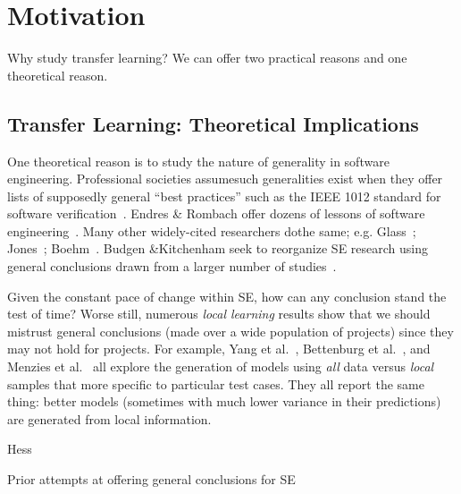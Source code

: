 \section{Motivation}
\label{sec:Motivation}

Why study transfer learning? We can offer two practical reasons and one theoretical reason.

\subsection{Transfer Learning: Theoretical Implications}

One theoretical reason is to study the nature of
generality in software engineering.  Professional
societies assumesuch generalities exist when they
offer lists of supposedly general ``best practices''
such as the IEEE 1012 standard for software
verification~\cite{1012}.  Endres & Rombach offer dozens
of lessons of software engineering~\cite{endres03}.  Many
other widely-cited researchers dothe same; e.g.
Glass~\cite{glass02}; Jones~\cite{jones10}; Boehm~\cite{hoehm00b}.  Budgen
&Kitchenham seek to reorganize SE research using
general conclusions drawn from a larger number of
studies~\cite{budgen06,budgen09}.

Given the constant pace of change within SE, how can
any conclusion stand the test of time?  Worse still,
numerous {\em local learning} results show that we
should mistrust general conclusions (made over a
wide population of projects) since they may not hold
for projects. For example, Yang et
al.~\cite{yang11}, Bettenburg et
al.~\cite{betten14}, and Menzies et al.~\cite{me12d}
all explore the generation of models using {\em all}
data versus {\em local} samples that more specific
to particular test cases. They all report the same
thing: better models (sometimes with much lower
variance in their predictions) are generated from
local information.

Hess


Prior attempts at offering general conclusions for SE~\cite{}
